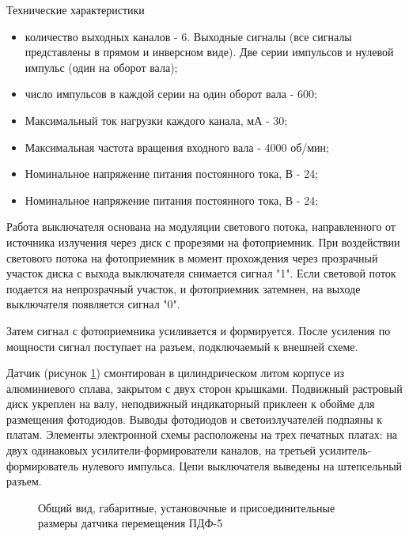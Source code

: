         Технические характеристики 
        \begin{itemize}
        \item количество выходных каналов - 6. Выходные сигналы (все сигналы
            представлены в прямом и инверсном виде). Две серии импульсов и
            нулевой импульс (один на оборот вала); 
        \item число импульсов в каждой серии на один оборот вала - 600;
        \item Максимальный ток нагрузки каждого канала, мА - 30;
        \item Максимальная частота вращения входного вала - 4000 об/мин;
        \item Номинальное напряжение питания постоянного тока, В - 24;
        \item Номинальное напряжение питания постоянного тока, В - 24;
        \end{itemize}

        Работа выключателя основана на модуляции светового потока,
        направленного от источника излучения через диск с прорезями на
        фотоприемник. При воздействии светового потока на фотоприемник в момент
        прохождения через прозрачный участок диска с выхода выключателя
        снимается сигнал "1". Если световой поток подается на непрозрачный
        участок, и фотоприемник затемнен, на выходе выключателя появляется
        сигнал "0".  
        
        Затем сигнал с фотоприемника усиливается и формируется. После усиления
        по мощности сигнал поступает на разъем, подключаемый к внешней схеме. 

        Датчик (рисунок \ref{fig:encoder}) смонтирован в цилиндрическом литом
        корпусе из алюминиевого сплава, закрытом с двух сторон крышками.
        Подвижный растровый диск укреплен на валу, неподвижный индикаторный
        приклеен к обойме для размещения фотодиодов. Выводы фотодиодов и
        светоизлучателей подпаяны к платам. Элементы электронной схемы
        расположены на трех печатных платах: на двух одинаковых
        усилители-формирователи каналов, на третьей усилитель-формирователь
        нулевого импульса. Цепи выключателя выведены на штепсельный разъем.

        \begin{figure}
            \caption{%
                Общий вид, габаритные, установочные и присоединительные размеры
                датчика перемещения ПДФ-5
            }
            \label{fig:encoder}
        \end{figure}
        

